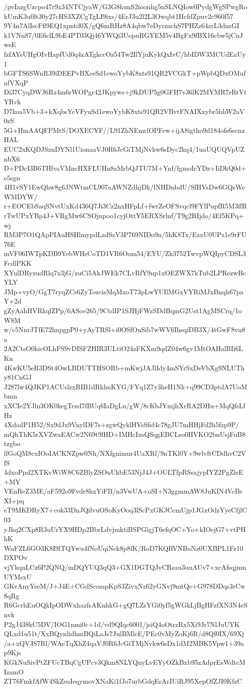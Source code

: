 /pvIazgUzcpo47r9x34NTCjyaW/G3G8kunS2ioonhg5nSLNQIow0PydgWgSPwgRo
kUmK3u0lt30y27cHS3XZCgTgLI9ixs/4ErJ3u2l2L3Owqbt1HcfdZpuv2c960f57
9Y4n7AlIscFfl9EQ1xpntd0X/gQ6mRHz8A4qbw7eDyrzachS7PHZz64zrL3dnsGI
k1VNn87/0E6clL9bE4PT03Qj46YWQi3UopuRGYEM5v4BgFx9fBX16cbw5jCnJwsE
fzfAYsUHgOIvHapfUd0q4zATgkccOz54Tw2IlYjuKykQxIvC/hbIDW3MCUdEaUy1
bGFTS6SWnR39iDEEPvBXceSd1ewoYybK8xts91QR2VCGkT+pWpbQDxOMufnfVXqP
Di37CyqDWJ6Rz4m6rWOPgr42JKpyws+j9kDUP5g0GFH7v36lK2MYMR7rRtVtYRvk
D7koa5Vb+3+kXqbsYcVFyuSd1ewoYybK8xts91QR2VBvtFNAIXxybr5hhW2aV0zS
5G+HmAAQFPMtS/DOXECYF//L91ZhNEmrlOPFew+ijA8igtho9d184ofs6ecnzHAL
EUC2xKQDJSznDYNl1UionaaVJ0R6JcGiTMjNvkw6sDyc2kq4/1uaUQUQVpUZnbX6
D+PDcI3B6THfvaVMncHXFLUHn8zMrbQJTU7M+Ynf/fgmoIcYDz+IiDkQ0d+e5sgn
4H1vSY1EwQhw8g6JNWtmCL907aAWNZdhjDk/lNHDnbdU/SfHVsDw6GQsWeWMDYW/
r+EOCEbSaqSNvtUxKd436Q7Ji3Cz2nxHFpLf+fwrZeOFSvqcl9FYlPupfR5M3ffR
rTwUPxYBp4J+VRgMw6CSOjnpoo1cyjOttY5ERXSrlnf/T9g2RIjdo/4Ef5KPq+wj
RM3P7O1QApPIAuHSHlmypdLzdSzV3P769NIDo9n/5hK8Tx/EzxU0UPz1e9rFU76E
mVF06IWTpKDB9YebWHsCoTD1VR6Oom54/EYU/Zk3752TwvpWQIpyCDSL3FcdlPKK
XYulDRyzudRlq7x3jG/zuCi5AkJWEk7CLvRfY9up1xOEZWX7kTub2LPRezwBcYLY
JMp+vyO/GgT7ryqZCs6ZyTozcisMqMxoT73pLwYUIlMGxVYRiMJxBnqh67paY+2d
gZyAahHVRkqlZPp/6ASoe265/9CtdIP1SJHjFWzSDdBqmG2Ust1AgMSCrq/1oW8M
w/c5NnrJTfE72hupgpP0+yAyTRSl+i0OSfOuSib7wWV6IhsqiDB3X/4tGwF8vu8a
2A2CtsO0kicOLhFS9vDISFZHIR3ULtiO24zFKXm9qdZ04w6gv1MtOAHalBIi6LKn
4KwKU5eR3DSt4OwLBDUTTHSORb+mKwjJAJlIdy4mSYrSxDeVbXg9NLUThy81CnGJ
J287lw4QJKP1ACUslzxRIB1dRkhuKYG/FYq1Z7y3heH1Nk+q99CD3ptdA7UoMbmn
xXCIe2YJln3OK0kegTezd7fBUq6IaDgLu/gW/8cKbJYmjhXrRA2DHu+MqQfsLfHz
4XdadP1H52/Sx9dJx9VnylDF7s+zgwQyklHVsSfsf4c78gJU7mHHjFd2h5fzp9P/
mQhThK5rXVZwaEACw2N69t9lHD+IMHcIxsQSqgEBCLso0HVKO2bnUsjFuB8tzgbo
lfGoQM8cxIOoIACKNZpw0Nh/NXfgnimur4UaXRf/9nTKl0Y+9wlvftCDdhvC2VfS
4dxoPpd2XTKvWiW8C6ZBlyZSOnUkbE53NjJ4J+OULTfpRSsajypIYZ2PgZleE+MY
VEnReZ3ME/aF592o9Fvdr8hxYiFB/n3VwUA+oSI+N3ggmmAW8JuKIN4VcBcXI+pq
eT9MKDRyX7+cok33DnJQilvuOSoKyOoq3lScPxGKJCcmUjp1JGxOdzYyeCfjlC03
yJkq2CXp8R3uUrYX9HDp2BbrLdvjmktiBSPGlgjT6efqOC+Yo+kIOejG7+vtPHhK
WnFZL6GO3K8I9lTQYwu4fNoUqiNck8p8fK/RoD7KQRVNBoNz0UXBPL1Fz10DXPOv
vjYkqnLCz6P2QNQ/mDQYUQ3qQ3+GX1DGTQJvCRsau3uuAUv7+xcAfsqjnmUYMsxU
GKvAnyYseM/J+J4E+CGdScompKpS3ZivxNz62yGNvj9mtQe+G978DDqs3rCw8qRg
R6GcrhEuOQkIpODWxhazfsAKnhkG+gQ7LZsYGi0yf5gWGkLjBgHFzfXN3N4eSnvk
P2gJ438kC5DV/IOG1nmi0c+1d/vd9QIqc6001/jsiQ4oOtrzRx5Xi9Jr7NlJuUYK
QLxd1u51t/XxBQynlidhmBQiLaJs7JulBMlcE/PEc0vMyZoKj6R/d8Qf0IX/69Xj
/a+xQVJS7Rl/WAeTqXhZ4qaVJ0R6JcGiTMjNvkw6sDx1dM2MBK5Vpw1+39ap9Kjs
KGkNuSivPtZFUcTBqCgUPcv3Qkm8NLYQnyLvEYyOZkBxb95zAdprEsWdtcMIzamO
ZT76FmkfAfW4SkZeaIeqymovXNaKi1fJo7urbGdqEsArIUiRJ95XepOfZJI0KfzC
